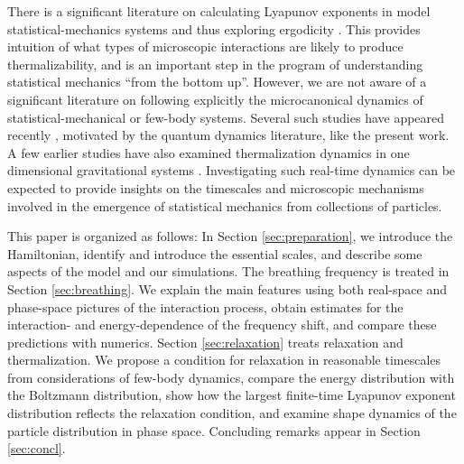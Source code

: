 \documentclass[a4paper, onecolumn]{revtex4-1}
\begin{document}
There is a significant literature on calculating Lyapunov exponents in model statistical-mechanics
systems and thus exploring ergodicity \cite{Dorfman_book_1999, deWijn_fine,
  Lyapunov_numerical_calculations, Lyapunov_analytical_calculations, FiniteTimeLyapunov}.  This
provides intuition of what types of microscopic interactions are likely to produce thermalizability,
and is an important step in the program of understanding statistical mechanics ``from the bottom
up''.  However, we are not aware of a significant literature on following explicitly the
microcanonical dynamics of statistical-mechanical or few-body systems.  Several such studies have
appeared recently \cite{DoyonSpohn_JSTAT17, Moore_arXiv17.10, JinKatsnelson_NJP13}, motivated by the
quantum dynamics literature, like the present work.  A few earlier studies have also examined
thermalization dynamics in one dimensional gravitational systems \cite{Yawn1997, Tsuchiya2000}.
%
Investigating such real-time dynamics can be expected to provide insights on the timescales and
microscopic mechanisms involved in the emergence of statistical mechanics from collections of
particles.


This paper is organized as follows: In Section \ref{sec:preparation}, we introduce the Hamiltonian,
identify and introduce the essential scales, and describe some aspects of the model and our
simulations.  The breathing frequency is treated in Section \ref{sec:breathing}.  We explain the
main features using both real-space and phase-space pictures of the interaction process, obtain
estimates for the interaction- and energy-dependence of the frequency shift, and compare these
predictions with numerics.  Section \ref{sec:relaxation} treats relaxation and thermalization.  We
propose a condition for relaxation in reasonable timescales from considerations of few-body
dynamics, compare the energy distribution with the Boltzmann distribution, show how the largest
finite-time Lyapunov exponent distribution reflects the relaxation condition, and examine shape
dynamics of the particle distribution in phase space.  Concluding remarks appear in Section
\ref{sec:concl}.
\end{document}
